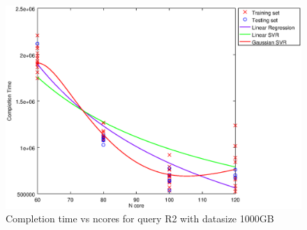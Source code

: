 
\begin {figure}[hbtp]
\centering
\includegraphics[width=\textwidth]{output/R2_1000_ONLY_1_OVER_NCORES/plot_R2_1000_bestmodels.eps}
\caption{Completion time vs ncores for query R2 with datasize 1000GB}
\label{fig:all_nonlinear_R2_1000}
\end {figure}
